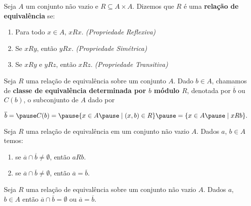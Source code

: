 \documentclass{beamer}
\begin{document}
    \begin{frame}
        \begin{definicao}
            Seja $A$ um conjunto não vazio \pause e $R\subseteq A \times A$. \pause Dizemos que $R$ é uma \textbf{relação de equivalência} se:\pause
            \begin{enumerate}[label={\roman*})]
                \item Para todo $x \in A$, $xRx$. \textit{(Propriedade Reflexiva)}\pause\vspace{.2cm}

                \item Se $xRy$, então $yRx$. \textit{(Propriedade Simétrica)}\pause\vspace{.2cm}

                \item Se $xRy$ e $yRz$, então $xRz$. \textit{(Propriedade Transitiva)}
            \end{enumerate}
        \end{definicao}
    \end{frame}

    \begin{frame}
        \begin{definicao}
            Seja $R$ uma relação de equivalência sobre um conjunto $A$. \pause Dado $b \in A$, \pause chamamos de \textbf{classe de equivalência \pause determinada por $b$ \pause módulo $R$}\pause, denotada por $\overline{b}$ \pause ou $C(b)$, \pause o subconjunto de $A$ \pause dado por\pause
            \begin{center}
                $\overline{b} =\pause C(b) = \pause \{x \in A \pause \mid (x, b) \in R\}\pause = \{x \in A \pause\mid xRb\}.$
            \end{center}
        \end{definicao}
    \end{frame}

    \begin{frame}
        \begin{proposicao}
            Seja $R$ uma relação de equivalência \pause em um conjunto não vazio $A$. \pause Dados $a$, $b \in A$ temos:\pause
            \begin{enumerate}[label={\roman*})]
                \item se $\overline{a} \cap \overline{b} \ne \emptyset$, \pause então $aRb$.\pause \vspace{.3cm}
                \item se  $\overline{a} \cap \overline{b} \neq \emptyset$, \pause então $\overline{a} = \overline{b}$.\pause
            \end{enumerate}
        \end{proposicao}

        \begin{corolario}
            Seja $R$ uma relação de equivalência sobre um conjunto não vazio $A$. \pause Dados $a$, $b \in A$ \pause então $\overline{a} \cap \overline{b} = \emptyset$ \pause ou $\overline{a} = \overline{b}$.
        \end{corolario}
    \end{frame}
\end{document}
